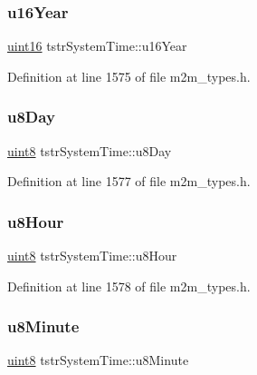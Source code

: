 \subsubsection{\texorpdfstring{u16\+Year}{u16Year}}
{\footnotesize\ttfamily \hyperlink{group__DataT_ga1daa745171fc6e31d942c161422a76f9}{uint16} tstr\+System\+Time\+::u16\+Year}



Definition at line 1575 of file m2m\+\_\+types.\+h.

\mbox{\label{structtstrSystemTime_ab5cb1c79c5ef97eb8fe72c7a2a755328}} 
\subsubsection{\texorpdfstring{u8\+Day}{u8Day}}
{\footnotesize\ttfamily \hyperlink{group__DataT_ga4df709a77647e870bbf1d955b8edc9a6}{uint8} tstr\+System\+Time\+::u8\+Day}



Definition at line 1577 of file m2m\+\_\+types.\+h.

\mbox{\label{structtstrSystemTime_ac8fe2421d9314b1f709c3d3ca9449058}} 
\subsubsection{\texorpdfstring{u8\+Hour}{u8Hour}}
{\footnotesize\ttfamily \hyperlink{group__DataT_ga4df709a77647e870bbf1d955b8edc9a6}{uint8} tstr\+System\+Time\+::u8\+Hour}



Definition at line 1578 of file m2m\+\_\+types.\+h.

\mbox{\label{structtstrSystemTime_a9e24f7615a4930ddc0c0c0c11f6e4897}} 
\subsubsection{\texorpdfstring{u8\+Minute}{u8Minute}}
{\footnotesize\ttfamily \hyperlink{group__DataT_ga4df709a77647e870bbf1d955b8edc9a6}{uint8} tstr\+System\+Time\+::u8\+Minute}



